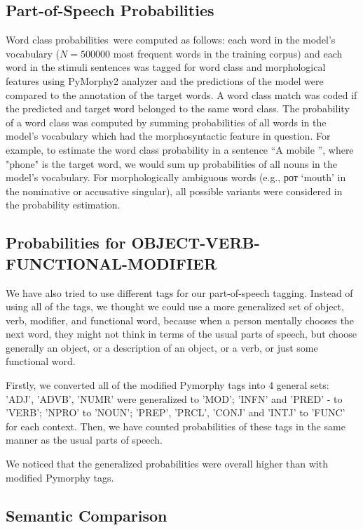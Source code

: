 \documentclass[a4paper]{article}
\begin{document}
\subsection{Part-of-Speech Probabilities}

Word class probabilities were computed as follows: each word in the model’s vocabulary (\(N = 500000\) most frequent words in the training corpus) and each word in the stimuli sentences was tagged for word class and morphological features using PyMorphy2 analyzer 
\cite{korobov:2015} and the predictions of the model were compared to the annotation of the target words. A word class match was coded if the predicted and target word belonged to the same word class. The probability of a word class was computed by summing probabilities of all words in the model’s vocabulary which had the morphosyntactic feature in question. For example, to estimate the word class probability in a sentence “A mobile \underline{\hspace{1em}}”, where "phone" is the target word, we would sum up probabilities of all nouns in the model’s vocabulary. For morphologically ambiguous words (e.g., рот ‘mouth’ in the nominative or accusative singular), all possible variants were considered in the probability estimation.

\subsection{Probabilities for OBJECT-VERB-FUNCTIONAL-MODIFIER}

We have also tried to use different tags for our part-of-speech tagging. Instead of using all of the tags, we thought we could use a more generalized set of object, verb, modifier, and functional word, because when a person mentally chooses the next word, they might not think in terms of the usual parts of speech, but choose generally an object, or a description of an object, or a verb, or just some functional word.

Firstly, we converted all of the modified Pymorphy tags into 4 general sets: 'ADJ', 'ADVB', 'NUMR' were generalized to 'MOD'; 'INFN' and 'PRED' - to 'VERB'; 'NPRO' to 'NOUN'; 'PREP', 'PRCL', 'CONJ' and 'INTJ' to 'FUNC' for each context. Then, we have counted probabilities of these tags in the same manner as the usual parts of speech. 

We noticed that the generalized probabilities were overall higher than with modified Pymorphy tags.

\subsection{Semantic Comparison}
\end{document}
